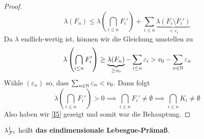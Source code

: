 \begin{satz}
\begin{proof}
$$
\lambda (F_n) \leq \lambda \left( \bigcap_{i\leq n} F_i' \right) + \sum_{i \leq n} \underbrace{\lambda (F_i \setminus F_i')}_{< \varepsilon_i}
$$
Da $\lambda$ endlich-wertig ist, können wir die Gleichung umstellen zu
$$
\lambda\left( \bigcap_{i \leq n} F_i' \right) \geq \underbrace{\lambda(F_n)}_{\geq v_0} - \sum_{i \leq n} \varepsilon_i > v_0 - \sum_{n \in \mathbb{N}} \varepsilon_n
$$
Wähle $(\varepsilon_n)$ so, dass $\sum_{n\in \mathbb{N}} \varepsilon_n < v_0$. Dann folgt
$$\lambda \left( \bigcap_{i \leq n } F_i' \right) > 0 \implies \bigcap_{i \leq n} F_i' \neq \emptyset \implies \bigcap_{i \leq n }K_i \neq \emptyset $$
Also haben wir \eqref{I5} gezeigt und somit war die Behauptung.
\end{proof}
\end{satz}

\begin{definition}
\begin{mdframed}
$\lambda^1_{\mathcal{F}^1}$ heißt \textbf{das eindimensionale Lebesgue-Prämaß}.
\end{mdframed}
\end{definition}

